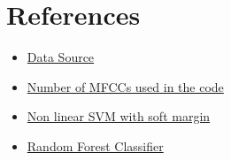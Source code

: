 \documentclass{article}
\begin{document}
\section*{References}
\begin{itemize}
    \item \href{https://huggingface.co/datasets/common_language}{Data Source}
    
    \item \href{https://ietresearch.onlinelibrary.wiley.com/doi/full/10.1049/tje2.12082#:~:text=All\%20performance\%20metrics\%20gave\%20the,studies\%20use\%20only\%2013\%20MFCCs}{Number of MFCCs used in the code}
    
    \item \href{https://scikit-learn.org/stable/modules/svm.html#svm-kernels}{Non linear SVM with soft margin}

    \item \href{https://scikit-learn.org/stable/modules/generated/sklearn.ensemble.RandomForestClassifier.html}{Random Forest Classifier}
\end{itemize}
\end{document}

